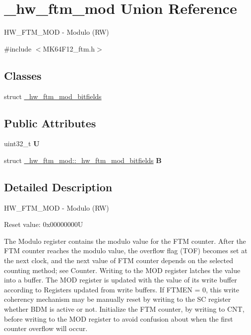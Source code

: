 \hypertarget{union__hw__ftm__mod}{}\section{\+\_\+hw\+\_\+ftm\+\_\+mod Union Reference}
\label{union__hw__ftm__mod}


H\+W\+\_\+\+F\+T\+M\+\_\+\+M\+OD -\/ Modulo (RW)  




{\ttfamily \#include $<$M\+K64\+F12\+\_\+ftm.\+h$>$}

\subsection*{Classes}
\begin{DoxyCompactItemize}
\item 
struct \hyperlink{struct__hw__ftm__mod_1_1__hw__ftm__mod__bitfields}{\+\_\+hw\+\_\+ftm\+\_\+mod\+\_\+bitfields}
\end{DoxyCompactItemize}
\subsection*{Public Attributes}
\begin{DoxyCompactItemize}
\item 
uint32\+\_\+t {\bfseries U}\hypertarget{union__hw__ftm__mod_a71f307c866a26669a0c3b4c9ba422368}{}\label{union__hw__ftm__mod_a71f307c866a26669a0c3b4c9ba422368}

\item 
struct \hyperlink{struct__hw__ftm__mod_1_1__hw__ftm__mod__bitfields}{\+\_\+hw\+\_\+ftm\+\_\+mod\+::\+\_\+hw\+\_\+ftm\+\_\+mod\+\_\+bitfields} {\bfseries B}\hypertarget{union__hw__ftm__mod_a8575ce2ceacbe039dcbce5de01a5e8e6}{}\label{union__hw__ftm__mod_a8575ce2ceacbe039dcbce5de01a5e8e6}

\end{DoxyCompactItemize}


\subsection{Detailed Description}
H\+W\+\_\+\+F\+T\+M\+\_\+\+M\+OD -\/ Modulo (RW) 

Reset value\+: 0x00000000U

The Modulo register contains the modulo value for the F\+TM counter. After the F\+TM counter reaches the modulo value, the overflow flag (T\+OF) becomes set at the next clock, and the next value of F\+TM counter depends on the selected counting method; see Counter. Writing to the M\+OD register latches the value into a buffer. The M\+OD register is updated with the value of its write buffer according to Registers updated from write buffers. If F\+T\+M\+EN = 0, this write coherency mechanism may be manually reset by writing to the SC register whether B\+DM is active or not. Initialize the F\+TM counter, by writing to C\+NT, before writing to the M\+OD register to avoid confusion about when the first counter overflow will occur. 


